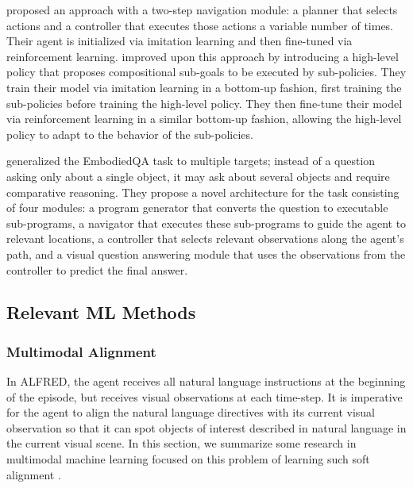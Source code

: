 \documentclass[11pt,a4paper]{article}
\begin{document}
\cite{Das2018EmbodiedQA} proposed an approach with a two-step navigation module: a planner that selects actions and a controller that executes those actions a variable number of times. Their agent is initialized via imitation learning and then fine-tuned via reinforcement learning. \cite{Das2018NeuralMC} improved upon this approach by introducing a high-level policy that proposes compositional sub-goals to be executed by sub-policies. They train their model via imitation learning in a bottom-up fashion, first training the sub-policies before training the high-level policy. They then fine-tune their model via reinforcement learning in a similar bottom-up fashion, allowing the high-level policy to adapt to the behavior of the sub-policies.

\cite{Yu2019MultiTargetEQ} generalized the EmbodiedQA task to multiple targets; instead of a question asking only about a single object, it may ask about several objects and require comparative reasoning. They propose a novel architecture for the task consisting of four modules: a program generator that converts the question to executable sub-programs, a navigator that executes these sub-programs to guide the agent to relevant locations, a controller that selects relevant observations along the agent's path, and a visual question answering module that uses the observations from the controller to predict the final answer.

\subsection{Relevant ML Methods}
\subsubsection{Multimodal Alignment}
\label{ssec:mmml}
In ALFRED, the agent receives all natural language instructions at the beginning of the episode, but receives visual observations at each time-step. It is imperative for the agent to align the natural language directives with its current visual observation so that it can spot objects of interest described in natural language in the current visual scene. In this section, we summarize some research in multimodal machine learning focused on this problem of learning such soft alignment \cite{baltruvsaitis2018multimodal}.
\end{document}
